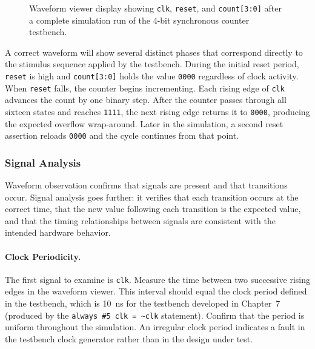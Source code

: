 \begin{figure}[h]
\centering
\caption{Waveform viewer display showing \texttt{clk}, \texttt{reset}, and
         \texttt{count[3:0]} after a complete simulation run of the 4-bit
         synchronous counter testbench.}
\label{fig:counter-waveform}
\end{figure}

A correct waveform will show several distinct phases that correspond directly
to the stimulus sequence applied by the testbench. During the initial reset
period, \texttt{reset} is high and \texttt{count[3:0]} holds the value
\texttt{0000} regardless of clock activity. When \texttt{reset} falls, the
counter begins incrementing. Each rising edge of \texttt{clk} advances the
count by one binary step. After the counter passes through all sixteen states
and reaches \texttt{1111}, the next rising edge returns it to \texttt{0000},
producing the expected overflow wrap-around. Later in the simulation, a second
reset assertion reloads \texttt{0000} and the cycle continues from that point.

\subsubsection{Signal Analysis}
\label{sec:sim-lab-analysis}

Waveform observation confirms that signals are present and that transitions
occur. Signal analysis goes further: it verifies that each transition occurs
at the correct time, that the new value following each transition is the
expected value, and that the timing relationships between signals are
consistent with the intended hardware behavior.

\paragraph{Clock Periodicity.}
The first signal to examine is \texttt{clk}. Measure the time between two
successive rising edges in the waveform viewer. This interval should equal
the clock period defined in the testbench, which is 10~ns for the testbench
developed in Chapter~7 (produced by the \texttt{always \#5 clk = \textasciitilde{}clk}
statement). Confirm that the period is uniform throughout the simulation.
An irregular clock period indicates a fault in the testbench clock generator
rather than in the design under test.

